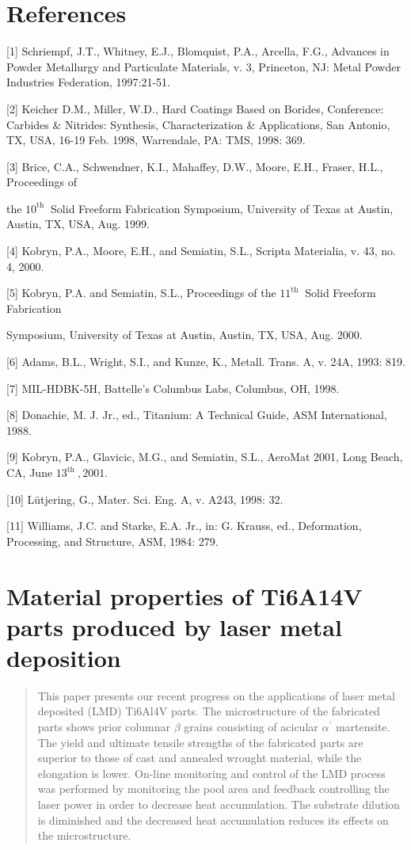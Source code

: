 \documentclass[10pt]{article}
\begin{document}
\section*{References}
[1] Schriempf, J.T., Whitney, E.J., Blomquist, P.A., Arcella, F.G., Advances in Powder Metallurgy and Particulate Materials, v. 3, Princeton, NJ: Metal Powder Industries Federation, 1997:21-51.

[2] Keicher D.M., Miller, W.D., Hard Coatings Based on Borides, Conference: Carbides \& Nitrides: Synthesis, Characterization \& Applications, San Antonio, TX, USA, 16-19 Feb. 1998, Warrendale, PA: TMS, 1998: 369.

[3] Brice, C.A., Schwendner, K.I., Mahaffey, D.W., Moore, E.H., Fraser, H.L., Proceedings of

the $10^{\text {th }}$ Solid Freeform Fabrication Symposium, University of Texas at Austin, Austin, TX, USA, Aug. 1999.

[4] Kobryn, P.A., Moore, E.H., and Semiatin, S.L., Scripta Materialia, v. 43, no. 4, 2000.

[5] Kobryn, P.A. and Semiatin, S.L., Proceedings of the $11^{\text {th }}$ Solid Freeform Fabrication

Symposium, University of Texas at Austin, Austin, TX, USA, Aug. 2000.

[6] Adams, B.L., Wright, S.I., and Kunze, K., Metall. Trans. A, v. 24A, 1993: 819.

[7] MIL-HDBK-5H, Battelle's Columbus Labs, Columbus, OH, 1998.

[8] Donachie, M. J. Jr., ed., Titanium: A Technical Guide, ASM International, 1988.

[9] Kobryn, P.A., Glavicic, M.G., and Semiatin, S.L., AeroMat 2001, Long Beach, CA, June $13^{\text {th }}, 2001$.

[10] Lütjering, G., Mater. Sci. Eng. A, v. A243, 1998: 32.

[11] Williams, J.C. and Starke, E.A. Jr., in: G. Krauss, ed., Deformation, Processing, and Structure, ASM, 1984: 279.

\section*{Material properties of Ti6A14V parts produced by laser metal deposition }


\begin{abstract}
This paper presents our recent progress on the applications of laser metal deposited (LMD) Ti6Al4V parts. The microstructure of the fabricated parts shows prior columnar $\beta$ grains consisting of acicular $\alpha^{\prime}$ martensite. The yield and ultimate tensile strengths of the fabricated parts are superior to those of cast and annealed wrought material, while the elongation is lower. On-line monitoring and control of the LMD process was performed by monitoring the pool area and feedback controlling the laser power in order to decrease heat accumulation. The substrate dilution is diminished and the decreased heat accumulation reduces its effects on the microstructure.
\end{abstract}
\end{document}
